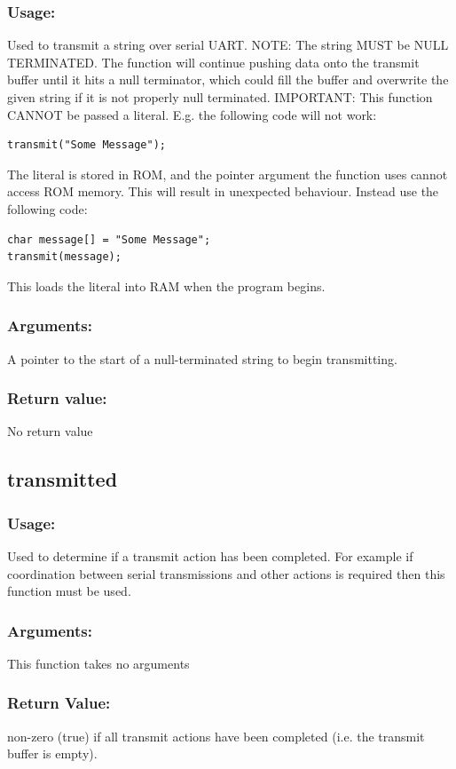 \documentclass[]{report}
\begin{document}
\subsubsection{Usage:}
Used to transmit a string over serial UART. NOTE: The string MUST be NULL TERMINATED. The function will continue pushing data onto the transmit buffer until it hits a null terminator, which could fill the buffer and overwrite the given string if it is not properly null terminated. \newline
IMPORTANT: This function CANNOT be passed a literal. E.g. the following code will not work:
\begin{lstlisting}
transmit("Some Message");
\end{lstlisting} 
The literal is stored in ROM, and the pointer argument the function uses cannot access ROM memory. This will result in unexpected behaviour. Instead use the following code:
\begin{lstlisting}
char message[] = "Some Message";
transmit(message);
\end{lstlisting}
This loads the literal into RAM when the program begins.

\subsubsection{Arguments:}
A pointer to the start of a null-terminated string to begin transmitting.

\subsubsection{Return value:}
No return value

\subsection{transmitted}
\subsubsection{Usage:}
Used to determine if a transmit action has been completed. For example if coordination between serial transmissions and other actions is required then this function must be used.

\subsubsection{Arguments:}
This function takes no arguments

\subsubsection{Return Value:}
non-zero (true) if all transmit actions have been completed (i.e. the transmit buffer is empty).
\end{document}
